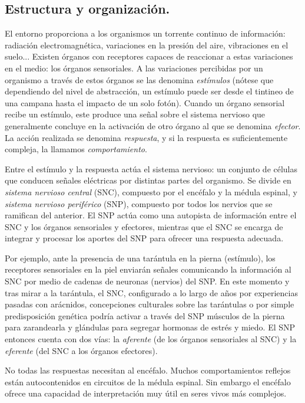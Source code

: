\subsection{Estructura y organización.}

El entorno proporciona a los organismos un torrente continuo de información: radiación electromagnética, variaciones en la presión del aire, vibraciones en el suelo... Existen órganos con receptores capaces de reaccionar a estas variaciones en el medio: los órganos sensoriales. A las variaciones percibidas por un organismo a través de estos órganos se las denomina \textit{estímulos} (nótese que dependiendo del nivel de abstracción, un estímulo puede ser desde el tintineo de una campana hasta el impacto de un solo fotón). Cuando un órgano sensorial recibe un estímulo, este produce una señal sobre el sistema nervioso que generalmente concluye en la activación de otro órgano al que se denomina \textit{efector}. La acción realizada se denomina \textit{respuesta}, y si la respuesta es suficientemente compleja, la llamamos \textit{comportamiento}.

Entre el estímulo y la respuesta actúa el sistema nervioso: un conjunto de células que conducen señales eléctricas por distintas partes del organismo. Se divide en \textit{sistema nervioso central} (SNC), compuesto por el encéfalo y la médula espinal, y \textit{sistema nervioso periférico} (SNP), compuesto por todos los nervios que se ramifican del anterior. El SNP actúa como una autopista de información entre el SNC y los órganos sensoriales y efectores, mientras que el SNC se encarga de integrar y procesar los aportes del SNP para ofrecer una respuesta adecuada.

Por ejemplo, ante la presencia de una tarántula en la pierna (estímulo), los receptores sensoriales en la piel enviarán señales comunicando la información al SNC por medio de cadenas de neuronas (nervios) del SNP. En este momento y tras mirar a la tarántula, el SNC, configurado a lo largo de años por experiencias pasadas con arácnidos, concepciones culturales sobre las tarántulas o por simple predisposición genética podría activar a través del SNP músculos de la pierna para zarandearla y glándulas para segregar hormonas de estrés y miedo. El SNP entonces cuenta con dos vías: la \textit{aferente} (de los órganos sensoriales al SNC) y la \textit{eferente} (del SNC a los órganos efectores).

No todas las respuestas necesitan al encéfalo. Muchos comportamientos reflejos están autocontenidos en circuitos de la médula espinal. Sin embargo el encéfalo ofrece una capacidad de interpretación muy útil en seres vivos más complejos.

